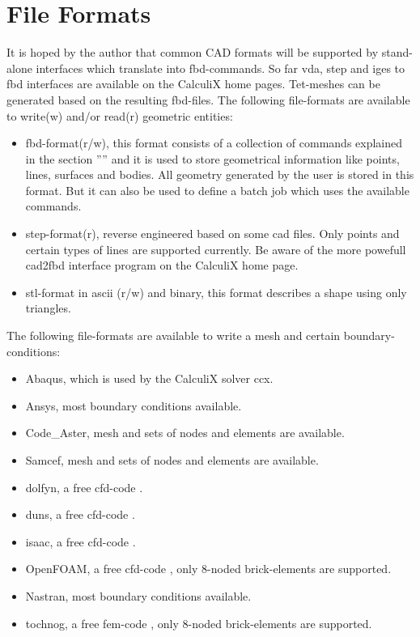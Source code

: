 \documentclass{article}
\begin{document}
\section{\label{File Formats}File Formats}
It is hoped by the author that common CAD formats will be supported by stand-alone interfaces which translate into fbd-commands. So far vda, step and iges to fbd interfaces are available on the CalculiX home pages. Tet-meshes can be generated based on the resulting fbd-files. The following file-formats are available to write(w) and/or read(r) geometric entities:
\begin{itemize}
\item fbd-format(r/w), this format consists of a collection of commands explained in the section '''' and it is used to store geometrical information like points, lines, surfaces and bodies. All geometry generated by the user is stored in this format. But it can also be used to define a batch job which uses the available commands.
\item step-format(r), reverse engineered based on some cad files. Only points and certain types of lines are supported currently. Be aware of the more powefull cad2fbd interface program on the CalculiX home page.
\item stl-format in ascii (r/w) and binary, this format describes a shape using only triangles.
\end{itemize}
The following file-formats are available to write a mesh and certain boundary-conditions:
\begin{itemize}
\item Abaqus, which is used by the CalculiX solver ccx.
\item Ansys, most boundary conditions available.
\item Code\_Aster, mesh and sets of nodes and elements are available.
\item Samcef, mesh and sets of nodes and elements are available.
\item dolfyn, a free cfd-code \cite{dolfyn}.
\item duns, a free cfd-code \cite{duns}.
\item isaac, a free cfd-code \cite{isaac}.
\item OpenFOAM, a free cfd-code \cite{OpenFOAM}, only 8-noded brick-elements are supported.
\item Nastran, most boundary conditions available.
\item tochnog, a free fem-code \cite{tochnog}, only 8-noded brick-elements are supported.
\end{itemize}
\end{document}
